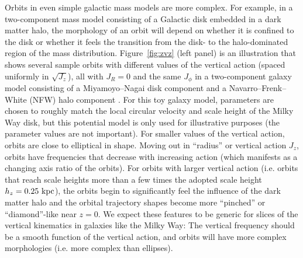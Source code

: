 Orbits in even simple galactic mass models are more complex.
For example, in a two-component mass model consisting of a Galactic disk embedded in a
dark matter halo, the morphology of an orbit will depend on whether it is confined to
the disk or whether it feels the transition from the disk- to the halo-dominated region
of the mass distribution.
Figure~\ref{fig:zvz} (left panel) is an illustration that shows several sample orbits
with different values of the vertical action (spaced uniformly in $\sqrt{J_z}$), all
with $J_R=0$ and the same $J_\phi$ in a two-component galaxy model consisting of a
Miyamoyo--Nagai disk component \citep{Miyamoto:1975} and a Navarro--Frenk--White (NFW)
halo component \citep{NFW:1996}.
For this toy galaxy model, parameters are chosen to roughly match the local circular
velocity and scale height of the Milky Way disk, but this potential model is only used
for illustrative purposes (the parameter values are not important).
For smaller values of the vertical action, orbits are close to elliptical in shape.
Moving out in ``radius'' or vertical action $J_z$, orbits have frequencies that decrease
with increasing action (which manifests as a changing axis ratio of the orbits).
For orbits with larger vertical action (i.e. orbits that reach scale heights more than a
few times the adopted scale height $h_z=0.25~\mathrm{kpc}$), the orbits begin to significantly
feel the influence of the dark matter halo and the orbital trajectory shapes become more
``pinched'' or ``diamond''-like near $z=0$.
We expect these features to be generic for slices of the vertical kinematics in galaxies
like the Milky Way: The vertical frequency should be a smooth function of the vertical
action, and orbits will have more complex morphologies (i.e. more complex than
ellipses).

